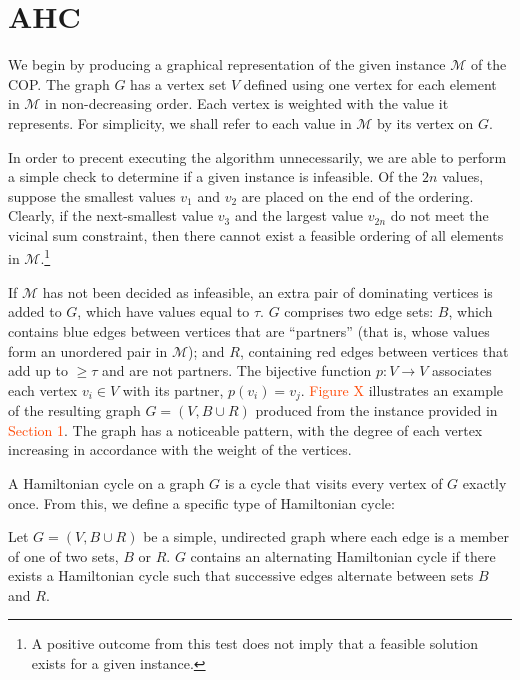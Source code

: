 \documentclass{elsarticle}
\begin{document}
\section{AHC}
\label{sec:ahc}
We begin by producing a graphical representation of the given instance $\mathcal{M}$ of the COP. The graph $G$ has a vertex set $V$ defined using one vertex for each element in $\mathcal{M}$ in non-decreasing order. Each vertex is weighted with the value it represents. For simplicity, we shall refer to each value in $\mathcal{M}$ by its vertex on $G$.

In order to precent executing the algorithm unnecessarily, we are able to perform a simple check to determine if a given instance is infeasible. Of the $2n$ values, suppose the smallest values $v_1$ and $v_2$ are placed on the end of the ordering. Clearly, if the next-smallest value $v_3$ and the largest value $v_{2n}$ do not meet the vicinal sum constraint, then there cannot exist a feasible ordering of all elements in $\mathcal{M}$.\footnote{A positive outcome from this test does not imply that a feasible solution exists for a given instance.}

If $\mathcal{M}$ has not been decided as infeasible, an extra pair of dominating vertices is added to $G$, which have values equal to $\tau$. $G$ comprises two edge sets: $B$, which contains blue edges between vertices that are ``partners'' (that is, whose values form an unordered pair in $\mathcal{M}$); and $R$, containing red edges between vertices that add up to $\geq \tau$ and are not partners. The bijective function $p : V \to V$ associates each vertex $v_i \in V$ with its partner, $p(v_i) = v_j$. \textcolor{OrangeRed}{Figure X} illustrates an example of the resulting graph $G = (V, B \cup R)$ produced from the instance provided in \textcolor{OrangeRed}{Section 1}. The graph has a noticeable pattern, with the degree of each vertex increasing in accordance with the weight of the vertices.



A Hamiltonian cycle on a graph $G$ is a cycle that visits every vertex of $G$ exactly once. From this, we define a specific type of Hamiltonian cycle:

\begin{definition}
	\label{defn:althamcycle}
	Let $G = (V, B \cup R)$ be a simple, undirected graph where each edge is a member of one of two sets, $B$ or $R$. $G$ contains an alternating Hamiltonian cycle if there exists a Hamiltonian cycle such that successive edges alternate between sets $B$ and $R$.
\end{definition}
\end{document}
